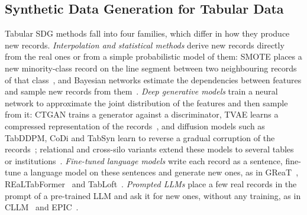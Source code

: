 \documentclass[conference]{IEEEtran}
\begin{document}
\subsection{Synthetic Data Generation for Tabular Data}
Tabular SDG methods fall into four families, which differ in how they produce new records. \emph{Interpolation and statistical methods} derive new records directly from the real ones or from a simple probabilistic model of them: SMOTE places a new minority-class record on the line segment between two neighbouring records of that class~\cite{chawla2002smote}, and Bayesian networks estimate the dependencies between features and sample new records from them~\cite{zhang2014privbayes}. \emph{Deep generative models} train a neural network to approximate the joint distribution of the features and then sample from it: CTGAN trains a generator against a discriminator, TVAE learns a compressed representation of the records~\cite{xu2019ctgan}, and diffusion models such as TabDDPM, CoDi and TabSyn learn to reverse a gradual corruption of the records~\cite{kotelnikov2023tabddpm,lee2023codi,zhang2024tabsyn}; relational and cross-silo variants extend these models to several tables or institutions~\cite{fan2020relational,shankar2024silofuse}. \emph{Fine-tuned language models} write each record as a sentence, fine-tune a language model on these sentences and generate new ones, as in GReaT~\cite{borisov2023great}, REaLTabFormer~\cite{solatorio2023realtabformer} and TabLoft~\cite{chen2026tabloft}. \emph{Prompted LLMs} place a few real records in the prompt of a pre-trained LLM and ask it for new ones, without any training, as in CLLM~\cite{seedat2024cllm} and EPIC~\cite{kim2024epic}.
\end{document}
